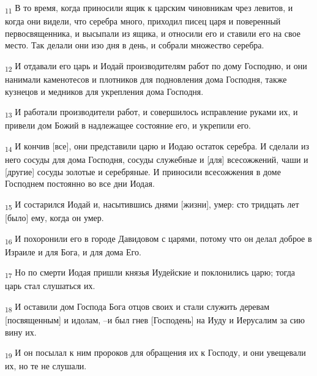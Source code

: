\begin{tcolorbox}
\textsubscript{11} В то время, когда приносили ящик к царским чиновникам чрез левитов, и когда они видели, что серебра много, приходил писец царя и поверенный первосвященника, и высыпали из ящика, и относили его и ставили его на свое место. Так делали они изо дня в день, и собрали множество серебра.
\end{tcolorbox}
\begin{tcolorbox}
\textsubscript{12} И отдавали его царь и Иодай производителям работ по дому Господню, и они нанимали каменотесов и плотников для подновления дома Господня, также кузнецов и медников для укрепления дома Господня.
\end{tcolorbox}
\begin{tcolorbox}
\textsubscript{13} И работали производители работ, и совершилось исправление руками их, и привели дом Божий в надлежащее состояние его, и укрепили его.
\end{tcolorbox}
\begin{tcolorbox}
\textsubscript{14} И кончив [все], они представили царю и Иодаю остаток серебра. И сделали из него сосуды для дома Господня, сосуды служебные и [для] всесожжений, чаши и [другие] сосуды золотые и серебряные. И приносили всесожжения в доме Господнем постоянно во все дни Иодая.
\end{tcolorbox}
\begin{tcolorbox}
\textsubscript{15} И состарился Иодай и, насытившись днями [жизни], умер: сто тридцать лет [было] ему, когда он умер.
\end{tcolorbox}
\begin{tcolorbox}
\textsubscript{16} И похоронили его в городе Давидовом с царями, потому что он делал доброе в Израиле и для Бога, и для дома Его.
\end{tcolorbox}
\begin{tcolorbox}
\textsubscript{17} Но по смерти Иодая пришли князья Иудейские и поклонились царю; тогда царь стал слушаться их.
\end{tcolorbox}
\begin{tcolorbox}
\textsubscript{18} И оставили дом Господа Бога отцов своих и стали служить деревам [посвященным] и идолам, --и был гнев [Господень] на Иуду и Иерусалим за сию вину их.
\end{tcolorbox}
\begin{tcolorbox}
\textsubscript{19} И он посылал к ним пророков для обращения их к Господу, и они увещевали их, но те не слушали.
\end{tcolorbox}

